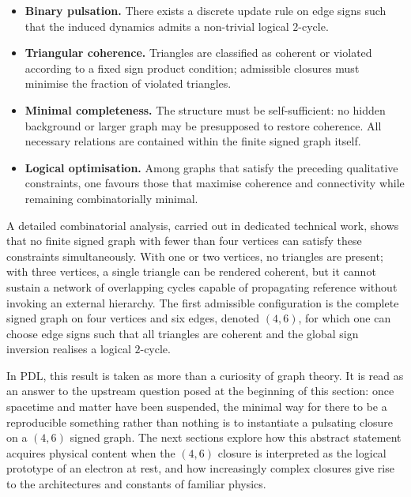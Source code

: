\documentclass[11pt,a4paper]{article}
\theoremstyle{definition}
\begin{document}
\begin{itemize}
  \item \textbf{Binary pulsation.} There exists a discrete update rule on edge signs such that the induced dynamics admits a non-trivial logical \(2\)-cycle.
  \item \textbf{Triangular coherence.} Triangles are classified as coherent or violated according to a fixed sign product condition; admissible closures must minimise the fraction of violated triangles.
  \item \textbf{Minimal completeness.} The structure must be self-sufficient: no hidden background or larger graph may be presupposed to restore coherence. All necessary relations are contained within the finite signed graph itself.
  \item \textbf{Logical optimisation.} Among graphs that satisfy the preceding qualitative constraints, one favours those that maximise coherence and connectivity while remaining combinatorially minimal.
\end{itemize}

A detailed combinatorial analysis, carried out in dedicated technical work, shows that no finite signed graph with fewer than four vertices can satisfy these constraints simultaneously.\cite{Laubscher_MinimalClosures_46_2024} With one or two vertices, no triangles are present; with three vertices, a single triangle can be rendered coherent, but it cannot sustain a network of overlapping cycles capable of propagating reference without invoking an external hierarchy. The first admissible configuration is the complete signed graph on four vertices and six edges, denoted \((4,6)\), for which one can choose edge signs such that all triangles are coherent and the global sign inversion realises a logical \(2\)-cycle.\cite{Laubscher_MinimalClosures_46_2024,Laubscher_EmergencePhysicalReality_2024}

In PDL, this result is taken as more than a curiosity of graph theory. It is read as an answer to the upstream question posed at the beginning of this section: once spacetime and matter have been suspended, the minimal way for there to be a reproducible something rather than nothing is to instantiate a pulsating closure on a \((4,6)\) signed graph. The next sections explore how this abstract statement acquires physical content when the \((4,6)\) closure is interpreted as the logical prototype of an electron at rest, and how increasingly complex closures give rise to the architectures and constants of familiar physics.\cite{Laubscher_EmergencePhysicalReality_2024,Laubscher_Alpha_v2_2024,Laubscher_ProtonArch_v2_2024}
\end{document}
